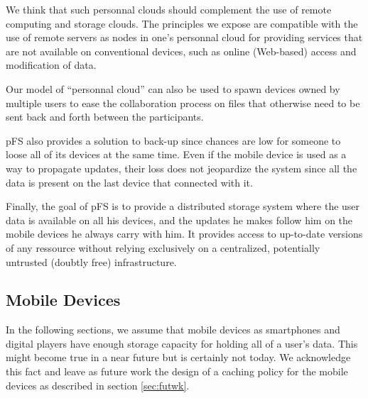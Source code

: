We think that such personnal clouds should complement the use of
remote computing and storage clouds. The principles we expose are
compatible with the use of remote servers as nodes in one's personnal
cloud for providing services that are not available on conventional
devices, such as online (Web-based) access and modification of data.

Our model of ``personnal cloud'' can also be used to spawn devices
owned by multiple users to ease the collaboration process on files that
otherwise need to be sent back and forth between the participants.

pFS also provides a solution to back-up since chances are low
for someone to loose all of its devices at the same time. Even if the
mobile device is used as a way to propagate updates, their loss does not
jeopardize the system since all the data is present on the last device
that connected with it. 

Finally, the goal of pFS is to provide a distributed storage system
where the user data is available on all his devices, and the updates
he makes follow him on the mobile devices he always carry with him. It
provides access to up-to-date versions of any ressource without
relying exclusively on a centralized, potentially untrusted (doubtly
free) infrastructure. 


\subsection {Mobile Devices}

In the following sections, we assume that mobile devices as smartphones and
digital players have enough storage capacity for holding all of a
user's data. This might become true in a near future but is certainly
not today. We acknowledge this fact and leave as future work the
design of a caching policy for the mobile devices as described in section 
\ref{sec:futwk}.



